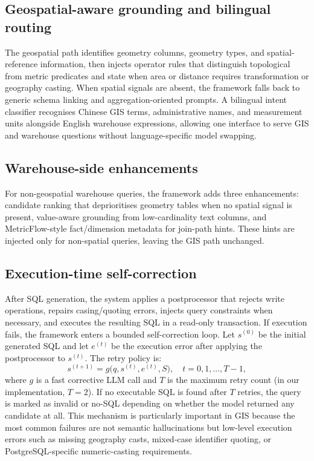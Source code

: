 \subsection{Geospatial-aware grounding and bilingual routing}

The geospatial path identifies geometry columns, geometry types, and spatial-reference information, then injects operator rules that distinguish topological from metric predicates and state when area or distance requires transformation or geography casting. When spatial signals are absent, the framework falls back to generic schema linking and aggregation-oriented prompts. A bilingual intent classifier recognises Chinese GIS terms, administrative names, and measurement units alongside English warehouse expressions, allowing one interface to serve GIS and warehouse questions without language-specific model swapping.

\subsection{Warehouse-side enhancements}

For non-geospatial warehouse queries, the framework adds three enhancements: candidate ranking that deprioritises geometry tables when no spatial signal is present, value-aware grounding from low-cardinality text columns, and MetricFlow-style fact/dimension metadata for join-path hints. These hints are injected only for non-spatial queries, leaving the GIS path unchanged.

\subsection{Execution-time self-correction}

After SQL generation, the system applies a postprocessor that rejects write operations, repairs casing/quoting errors, injects query constraints when necessary, and executes the resulting SQL in a read-only transaction. If execution fails, the framework enters a bounded self-correction loop. Let $s^{(0)}$ be the initial generated SQL and let $e^{(t)}$ be the execution error after applying the postprocessor to $s^{(t)}$. The retry policy is:
\begin{equation}
  s^{(t+1)} = g\big(q, s^{(t)}, e^{(t)}, S\big), \quad t = 0,1,\dots,T-1,
\end{equation}
where $g$ is a fast corrective LLM call and $T$ is the maximum retry count (in our implementation, $T=2$). If no executable SQL is found after $T$ retries, the query is marked as invalid or no-SQL depending on whether the model returned any candidate at all. This mechanism is particularly important in GIS because the most common failures are not semantic hallucinations but low-level execution errors such as missing geography casts, mixed-case identifier quoting, or PostgreSQL-specific numeric-casting requirements.

